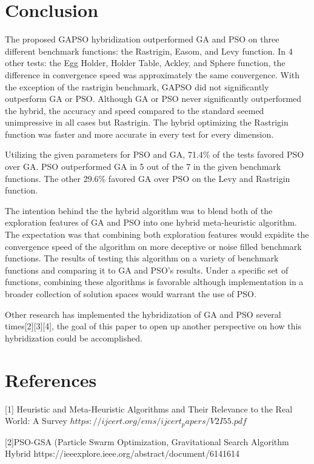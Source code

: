 \documentclass[twocolumn]{article}
\begin{document}
\section{Conclusion}

	    The proposed GAPSO hybridization outperformed GA and PSO on three different benchmark functions: the Rastrigin, Easom, and Levy function. In 4 other tests: the Egg Holder, Holder Table, Ackley, and Sphere function, the difference in convergence speed was approximately the same convergence. With the exception of the rastrigin benchmark, GAPSO did not significantly outperform GA or PSO. Although GA or PSO never significantly outperformed the hybrid, the accuracy and speed compared to the standard seemed unimpressive in all cases but Rastrigin. The hybrid optimizing the Rastrigin function was faster and more accurate in every test for every dimension.

Utilizing the given parameters for PSO and GA, 71.4\% of the tests favored PSO over GA. PSO outperformed GA in 5 out of the 7 in the given benchmark functions. The other 29.6\% favored GA over PSO on the Levy and Rastrigin function.

The intention behind the the hybrid algorithm was to blend both of the exploration features of GA and PSO into one hybrid meta-heuristic algorithm. The expectation was that combining both exploration features would expidite the convergence speed of the algorithm on more deceptive or noise filled benchmark functions. The results of testing this algorithm on a variety of benchmark functions and comparing it to GA and PSO's results. Under a specific set of functions, combining these algorithms is favorable although implementation in a broader collection of solution spaces would warrant the use of PSO.

Other research has implemented the hybridization of GA and PSO several times[2][3][4], the goal of this paper to open up another perspective on how this hybridization could be accomplished.

\section{References}

[1] Heuristic and Meta-Heuristic Algorithms and Their Relevance to the Real World: A Survey
$https://ijcert.org/ems/ijcert_papers/V2I55.pdf$


[2]PSO-GSA (Particle Swarm Optimization, Gravitational Search Algorithm Hybrid
https://ieeexplore.ieee.org/abstract/document/6141614
\end{document}
